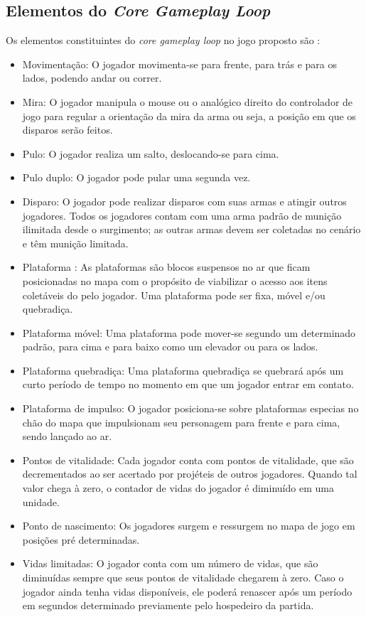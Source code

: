 \subsection{Elementos do \textit{Core Gameplay Loop}}\label{subsec:coreGameplay}
Os elementos constituintes do \textit{core gameplay loop} no jogo proposto são :
\begin{itemize}
    \item Movimentação: O jogador movimenta-se para frente, para trás e para os lados, podendo andar ou correr.
    \item Mira: O jogador manipula o mouse ou o analógico direito do controlador de jogo para regular a orientação da mira da arma ou seja, a posição em que os disparos serão feitos.
    \item Pulo: O jogador realiza um salto, deslocando-se para cima.
    \item Pulo duplo: O jogador pode pular uma segunda vez.
    \item Disparo: O jogador pode realizar disparos com suas armas e atingir outros jogadores. Todos os jogadores contam com uma arma padrão de munição ilimitada desde o surgimento; as outras armas devem ser coletadas no cenário e têm munição limitada. 
    \item Plataforma : As plataformas são blocos suspensos no ar que ficam posicionadas no mapa com o propósito de viabilizar o acesso aos itens coletáveis do pelo jogador. Uma plataforma pode ser fixa, móvel e/ou quebradiça.
    \item Plataforma móvel: Uma plataforma pode mover-se segundo um determinado padrão, para cima e para baixo como um elevador ou para os lados.
    \item Plataforma quebradiça: Uma plataforma quebradiça se quebrará após um curto período de tempo no momento em que um jogador entrar em contato.
    \item Plataforma de impulso: O jogador posiciona-se sobre plataformas especias no chão do mapa que impulsionam seu personagem para frente e para cima, sendo lançado ao ar.
    \item Pontos de vitalidade: Cada jogador conta com pontos de vitalidade, que são decrementados ao ser acertado por projéteis de outros jogadores. Quando tal valor chega à zero, o contador de vidas do jogador é diminuído em uma unidade.
    \item Ponto de nascimento: Os jogadores surgem e ressurgem no mapa de jogo em posições pré determinadas.
    \item Vidas limitadas: O jogador conta com um número de vidas, que são diminuídas sempre que seus pontos de vitalidade chegarem à zero. Caso o jogador ainda tenha vidas disponíveis, ele poderá renascer após um período em segundos determinado previamente pelo hospedeiro da partida.

\end{itemize}
